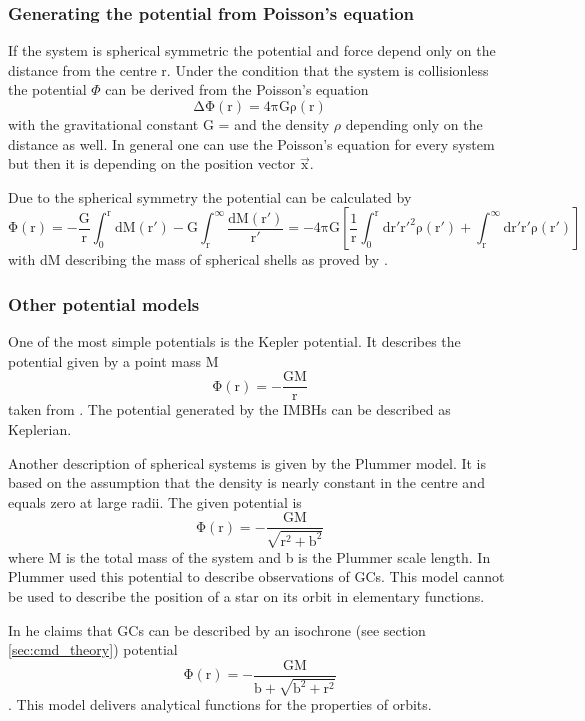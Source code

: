 \subsubsection{Generating the potential from Poisson's equation}\label{sec:poisson}
If the system is spherical symmetric the potential and force depend only on the distance from the centre r. Under the condition that the system is collisionless the potential \(\Phi\) can be derived from the Poisson's equation \begin{equation}\label{eq:Poisson}
\mathrm{\Delta\Phi(r)=4\pi G \rho(r)}
\end{equation}
with the gravitational constant G =  \citep{2015arXiv150707956M} and the density \(\rho\) depending only on the distance as well. In general one can use the Poisson's equation for every system but then it is depending on the position vector \(\vec{\mathrm{x}}\). 
\par Due to the spherical symmetry the potential can be calculated by 
\begin{equation}\label{eq:numerical_poisson}
\mathrm{\Phi(r)=-\frac{G}{r}\int_0^r{\mathrm{d}M(r')}-G\int_r^{\infty}{\frac{\mathrm{d}M(r')}{r'}}=-4\pi G\left[\frac{1}{r}\int_0^r\mathrm{d}r'r'^2\rho(r')+\int_r^{\infty}\mathrm{d}r'r'\rho(r')\right]}
\end{equation} with dM describing the mass of spherical shells as proved by \citet[eq. 2.28]{2008gady.book.....B}. 
\subsubsection{Other potential models}\label{sec:other_pot}
One of the most simple potentials is the Kepler potential. It describes the potential given by a point mass M
\begin{equation}\label{eq:kep_pot}
\mathrm{\Phi(r)=-\frac{GM}{r}}
\end{equation}  taken from \citet[eq. 2.34]{2008gady.book.....B}. The potential generated by the \acp{IMBH} can be described  as Keplerian. 
\par Another description of spherical systems is given by the Plummer model. It is based on the assumption that the density is nearly constant in the centre and equals zero at large radii. The given potential is 
\begin{equation}\label{eq:Plum_pot}
\mathrm{\Phi(r)=-\frac{GM}{\sqrt{r^2+b^2}}}
\end{equation}
\citep[eq. 2.44a]{2008gady.book.....B} where M is the total mass of the system and b is the Plummer scale length. In \citet{1911MNRAS..71..460P} Plummer used this potential to describe observations of \acp{GC}. This model cannot be used to describe the position of a star on its orbit in elementary functions. 
\par In \citet{2014arXiv1411.4937B} he claims that \acp{GC} can be described by an isochrone (see section \ref{sec:cmd_theory}) potential 
\begin{equation}\label{eq:isochr_pot}
\mathrm{\Phi(r)=-\frac{GM}{b+\sqrt{b^2+r^2}}}
\end{equation} 
\citep[eq. 2.47]{2008gady.book.....B}. This model delivers analytical functions for the properties of orbits.
